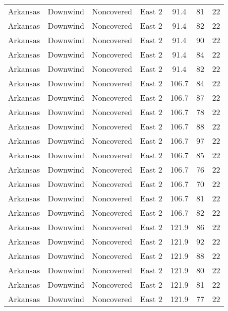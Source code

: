 \documentclass{article}
\begin{document}
\begin{longtable}[H]{ccccccc}
Arkansas & Downwind  & Noncovered & East 2        & 91.4         & 81          & 22  \\
Arkansas & Downwind  & Noncovered & East 2        & 91.4         & 82          & 22  \\
Arkansas & Downwind  & Noncovered & East 2        & 91.4         & 90          & 22  \\
Arkansas & Downwind  & Noncovered & East 2        & 91.4         & 84          & 22  \\
Arkansas & Downwind  & Noncovered & East 2        & 91.4         & 82          & 22  \\
Arkansas & Downwind  & Noncovered & East 2        & 106.7        & 84          & 22  \\
Arkansas & Downwind  & Noncovered & East 2        & 106.7        & 87          & 22  \\
Arkansas & Downwind  & Noncovered & East 2        & 106.7        & 78          & 22  \\
Arkansas & Downwind  & Noncovered & East 2        & 106.7        & 88          & 22  \\
Arkansas & Downwind  & Noncovered & East 2        & 106.7        & 97          & 22  \\
Arkansas & Downwind  & Noncovered & East 2        & 106.7        & 85          & 22  \\
Arkansas & Downwind  & Noncovered & East 2        & 106.7        & 76          & 22  \\
Arkansas & Downwind  & Noncovered & East 2        & 106.7        & 70          & 22  \\
Arkansas & Downwind  & Noncovered & East 2        & 106.7        & 81          & 22  \\
Arkansas & Downwind  & Noncovered & East 2        & 106.7        & 82          & 22  \\
Arkansas & Downwind  & Noncovered & East 2        & 121.9        & 86          & 22  \\
Arkansas & Downwind  & Noncovered & East 2        & 121.9        & 92          & 22  \\
Arkansas & Downwind  & Noncovered & East 2        & 121.9        & 88          & 22  \\
Arkansas & Downwind  & Noncovered & East 2        & 121.9        & 80          & 22  \\
Arkansas & Downwind  & Noncovered & East 2        & 121.9        & 81          & 22  \\
Arkansas & Downwind  & Noncovered & East 2        & 121.9        & 77          & 22  \\

\end{longtable}
\end{document}
